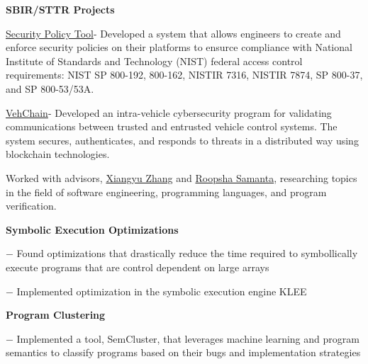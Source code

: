 \documentclass[]{deedy-resume-openfont}
\begin{document}
\begin{tightemize}
\item {\selectfont\bfseries SBIR/STTR Projects}
	\begin{tightemize}
		\vspace{.05in} %
    \item \href{https://www.securitypolicytool.com}{Security Policy Tool}- Developed a system that allows engineers to create and enforce security policies on their platforms to ensurce compliance with National Institute of Standards and Technology (NIST) federal access control requirements: NIST SP 800-192, 800-162, NISTIR 7316, NISTIR 7874, SP 800-37, and SP 800-53/53A.
    \item \href{https://www.infobeyondtech.com/vehchain/}{VehChain}- Developed an intra-vehicle cybersecurity program for validating communications between trusted and entrusted vehicle control systems. The system secures, authenticates, and responds to threats in a distributed way using blockchain technologies.
    \end{tightemize}
\end{tightemize}
\sectionsep


\vspace{.05in} %
Worked with advisors, \href{https://www.cs.purdue.edu/homes/xyzhang/}{Xiangyu Zhang} and 
\href{https://www.cs.purdue.edu/homes/roopsha/}{Roopsha Samanta}, researching topics in
the field of software engineering, programming languages, and program verification. 
\vspace{.15in} %
\begin{tightemize}
\item {\selectfont\bfseries Symbolic Execution Optimizations}
	\vspace{.05in} %
	\begin{tightemize}
		\item[$-$] Found optimizations that drastically reduce the time required to symbollically execute
		   programs that are control dependent on large arrays
	   	\item[$-$]Implemented optimization in the symbolic execution engine KLEE 
	\end{tightemize}
	\vspace{.05in} %
\item {\selectfont\bfseries Program Clustering}
	\begin{tightemize}
		\vspace{.05in} %
		\item[$-$] Implemented a tool, SemCluster, that leverages machine learning and
			   program semantics to classify programs based on their bugs and
			   implementation strategies
	\end{tightemize}
\end{tightemize}
\sectionsep
\end{document}
